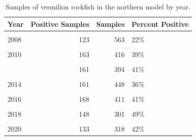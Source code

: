 \documentclass[11pt,
  english,
]{article}
\begin{document}
\begin{table}

\caption{\label{tab:tab-year-ccfrp}Samples of vermilion rockfish in the northern model by year.}
\centering
\begin{tabular}[t]{lrrl}
\toprule
Year & Positive Samples & Samples & Percent Positive\\
\midrule
\cellcolor{gray!6}{2007} & \cellcolor{gray!6}{92} & \cellcolor{gray!6}{539} & \cellcolor{gray!6}{17\%}\\
2008 & 123 & 563 & 22\%\\
\cellcolor{gray!6}{2009} & \cellcolor{gray!6}{113} & \cellcolor{gray!6}{366} & \cellcolor{gray!6}{31\%}\\
2010 & 163 & 416 & 39\%\\
\cellcolor{gray!6}{2011} & \cellcolor{gray!6}{139} & \cellcolor{gray!6}{366} & \cellcolor{gray!6}{38\%}\\
\addlinespace
2012 & 161 & 394 & 41\%\\
\cellcolor{gray!6}{2013} & \cellcolor{gray!6}{109} & \cellcolor{gray!6}{426} & \cellcolor{gray!6}{26\%}\\
2014 & 161 & 448 & 36\%\\
\cellcolor{gray!6}{2015} & \cellcolor{gray!6}{98} & \cellcolor{gray!6}{224} & \cellcolor{gray!6}{44\%}\\
2016 & 168 & 411 & 41\%\\
\addlinespace
\cellcolor{gray!6}{2017} & \cellcolor{gray!6}{155} & \cellcolor{gray!6}{366} & \cellcolor{gray!6}{42\%}\\
2018 & 148 & 301 & 49\%\\
\cellcolor{gray!6}{2019} & \cellcolor{gray!6}{164} & \cellcolor{gray!6}{306} & \cellcolor{gray!6}{54\%}\\
2020 & 133 & 318 & 42\%\\
\bottomrule
\end{tabular}
\end{table}

\FloatBarrier
\end{document}
